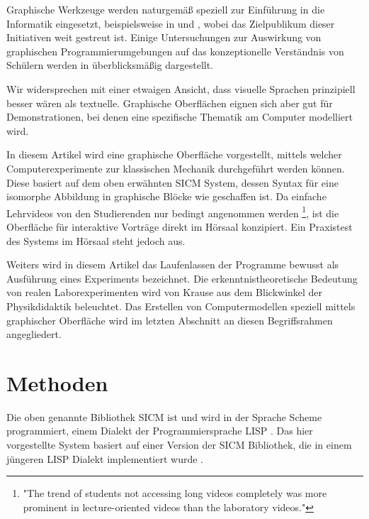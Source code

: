 \documentclass[twocolumn, 10pt]{article}
\begin{document}
Graphische Werkzeuge werden naturgemäß speziell zur Einführung in die Informatik eingesetzt, beispielsweise in \cite{cModrow 10} und \cite{cPrice 11}, wobei das Zielpublikum dieser Initiativen weit gestreut ist. Einige Untersuchungen zur Auswirkung von graphischen Programmierumgebungen auf das konzeptionelle Verständnis von Schülern werden in \cite{cXu 12} überblicksmäßig dargestellt.

Wir widersprechen mit \cite{cConversy 13} einer etwaigen Ansicht, dass visuelle Sprachen prinzipiell besser wären als textuelle. Graphische Oberflächen eignen sich aber gut für Demonstrationen, bei denen eine spezifische Thematik am Computer modelliert wird.

In diesem Artikel wird eine graphische Oberfläche vorgestellt, mittels welcher Computerexperimente zur klassischen Mechanik durchgeführt werden können. Diese basiert auf dem oben erwähnten SICM System, dessen Syntax für eine isomorphe Abbildung in graphische Blöcke wie geschaffen ist. Da einfache Lehrvideos von den Studierenden nur bedingt angenommen werden \cite{cLin 14}\footnote{"The trend of students not accessing long videos completely was more prominent in lecture-oriented videos than the laboratory videos."}, ist die Oberfläche für interaktive Vorträge direkt im Hörsaal konzipiert. Ein Praxistest des Systems im Hörsaal steht jedoch aus.

Weiters wird in diesem Artikel das Laufenlassen der Programme bewusst als Ausführung eines Experiments bezeichnet. Die erkenntnistheoretische Bedeutung von realen Laborexperimenten wird von Krause \cite{cKrause 15} aus dem Blickwinkel der Physikdidaktik beleuchtet. Das Erstellen von Computermodellen speziell mittels graphischer Oberfläche wird im letzten Abschnitt an diesen Begriffsrahmen angegliedert.

\section{Methoden}
Die oben genannte Bibliothek SICM ist und wird in der Sprache Scheme \cite{cScheme 16} programmiert, einem Dialekt der Programmiersprache LISP \cite{cMcCarthy 17}. Das hier vorgestellte System basiert auf einer Version der SICM Bibliothek, die in einem jüngeren LISP Dialekt implementiert wurde \cite{cColin 18}.
\end{document}
